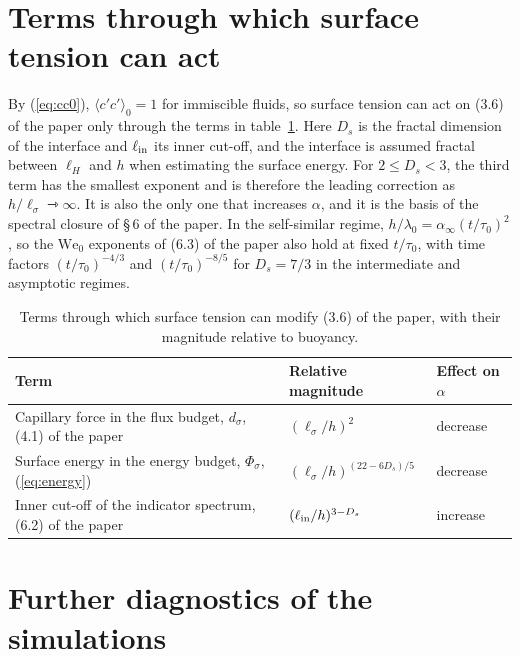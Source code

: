\documentclass[11pt]{article}
\newcommand{\avg}[1]{\langle #1\rangle}
\newcommand{\We}{\mathrm{We}_0}
\newcommand{\lls}{\ell_\sigma}
\begin{document}
\section{Terms through which surface tension can act}\label{sec:terms}

By (\ref{eq:cc0}), $\avg{c' c'}_0 = 1$ for immiscible fluids, so surface tension can act on (3.6) of the paper only through the terms in table~\ref{tab:terms}. Here $D_s$ is the fractal dimension of the interface and $\ell_{\rm in}$ its inner cut-off, and the interface is assumed fractal between $\ell_H$ and $h$ when estimating the surface energy. For $2 \le D_s < 3$, the third term has the smallest exponent and is therefore the leading correction as $h/\lls \rightarrowtriangle \infty$. It is also the only one that increases $\alpha$, and it is the basis of the spectral closure of \S\,6 of the paper. In the self-similar regime, $h/\lambda_0 = \alpha_\infty (t/\tau_0)^2$, so the $\We$ exponents of (6.3) of the paper also hold at fixed $t/\tau_0$, with time factors $(t/\tau_0)^{-4/3}$ and $(t/\tau_0)^{-8/5}$ for $D_s = 7/3$ in the intermediate and asymptotic regimes.

\begin{table}[h!]
  \centering
  \begin{tabular}{lll}
    \toprule
    Term & Relative magnitude & Effect on $\alpha$ \\
    \midrule
    Capillary force in the flux budget, $d_\sigma$, (4.1) of the paper & $(\lls/h)^2$ & decrease \\
    Surface energy in the energy budget, $\Phi_\sigma$, (\ref{eq:energy}) & $(\lls/h)^{(22 - 6 D_s)/5}$ & decrease \\
    Inner cut-off of the indicator spectrum, (6.2) of the paper & $(\ell_{\rm in}/h)^{3 - D_s}$ & increase \\
    \bottomrule
  \end{tabular}
  \caption{Terms through which surface tension can modify (3.6) of the paper, with their magnitude relative to buoyancy.}
  \label{tab:terms}
\end{table}

\section{Further diagnostics of the simulations}\label{sec:sims}
\end{document}
